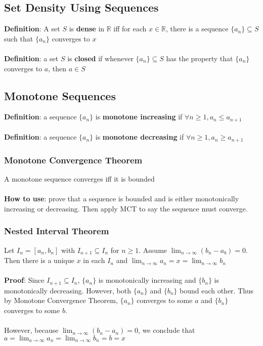 \documentclass{article}
\begin{document}
  \subsection{Set Density Using Sequences}
  \textbf{Definition}: A set $S$ is \textbf{dense} in $\mathbb{R}$ iff for each $x \in \mathbb{R}$, there is a sequence $\{a_n\} \subseteq S$ such that $\{a_n\}$ converges to $x$ \\ \\
  \textbf{Definition}: a set $S$ is \textbf{closed} if whenever $\{a_n\} \subseteq S$ has the property that $\{a_n\}$ converges to $a$, then $a \in S$
  \subsection{Monotone Sequences}
  \textbf{Definition}: a sequence $\{a_n\}$ is \textbf{monotone increasing} if $\forall n \geq 1, a_n \leq a_{n+1}$ \\ \\
  \textbf{Definition}: a sequence $\{a_n\}$ is \textbf{monotone decreasing} if $\forall n \geq 1, a_n \geq a_{n+1}$
  \subsubsection{Monotone Convergence Theorem}
  A monotone sequence converges iff it is bounded \\ \\
  \textbf{How to use}: prove that a sequence is bounded and is either monotonically increasing or decreasing. Then apply MCT to say the sequence must converge.
  \subsubsection{Nested Interval Theorem}
  Let $I_n = [a_n, b_n]$ with $I_{n+1} \subseteq I_n$ for $n \geq 1$. Assume $\lim_{n \rightarrow \infty}(b_n - a_b) = 0$. Then there is a unique $x$ in each $I_n$ and $\lim_{n \rightarrow \infty}{a_n} = x = \lim_{n \rightarrow \infty}{b_n}$ \\ \\
  \textbf{Proof}: Since $I_{n+1} \subseteq I_n$, $\{a_n\}$ is monotonically increasing and $\{b_n\}$ is monotonically decreasing. However, both $\{a_n\}$ and $\{b_n\}$ bound each other. Thus by Monotone Convergence Theorem, $\{a_n\}$ converges to some $a$ and $\{b_n\}$ converges to some $b$. \\ \\
  However, because $\lim_{n \rightarrow \infty}(b_n - a_n) = 0$, we conclude that $a = \lim_{a \rightarrow \infty}{a_n} = \lim_{n \rightarrow \infty}{b_n} = b = x$
\end{document}
